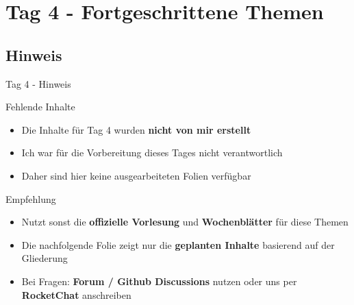 \section{Tag 4 - Fortgeschrittene Themen}

\subsection{Hinweis}

\begin{frame}{Tag 4 - Hinweis}
  \begin{alertblock}{Fehlende Inhalte}
    \begin{itemize}
      \item Die Inhalte für Tag 4 wurden \textbf{nicht von mir erstellt}
      \item Ich war für die Vorbereitung dieses Tages nicht verantwortlich
      \item Daher sind hier keine ausgearbeiteten Folien verfügbar
    \end{itemize}
  \end{alertblock}

  \begin{exampleblock}{Empfehlung}
    \begin{itemize}
      \item Nutzt sonst die \textbf{offizielle Vorlesung} und \textbf{Wochenblätter} für diese Themen
      \item Die nachfolgende Folie zeigt nur die \textbf{geplanten Inhalte} basierend auf der Gliederung
      \item Bei Fragen: \textbf{Forum / Github Discussions} nutzen oder uns per \textbf{RocketChat} anschreiben
    \end{itemize}
  \end{exampleblock}
\end{frame}

